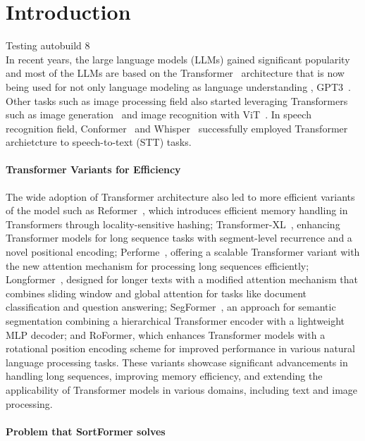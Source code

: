 \documentclass{article}
\begin{document}
\section{Introduction}
Testing autobuild 8 \\
In recent years, the large language models (LLMs) \cite{radford2019language, rao2022megatron} gained significant popularity and most of the LLMs are based on the Transformer~\cite{vaswani2017attention} architecture that is now being used for not only language modeling
as language understanding \cite{devlin2018bert, raffel2019learning}, GPT3~\cite{brown2020gpt3}. Other tasks such as image processing field also started leveraging Transformers such as image generation~\cite{parmar2018image} and image recognition with ViT~\cite{dosovitskiy2020image}. In speech recognition field, Conformer~\cite{gulati2020conformer} and Whisper~\cite{radford2023robust} successfully employed Transformer archietcture to speech-to-text (STT) tasks.

\paragraph{Transformer Variants for Efficiency}
The wide adoption of Transformer architecture also led to more efficient variants of the model such as Reformer~\cite{kitaev2019reformer}, which introduces efficient memory handling in Transformers through locality-sensitive hashing; Transformer-XL~\cite{dai2019transformer}, enhancing Transformer models for long sequence tasks with segment-level recurrence and a novel positional encoding; Performe~\cite{choromanski2020rethinking}, offering a scalable Transformer variant with the new attention mechanism for processing long sequences efficiently; Longformer~\cite{beltagy2020longformer}, designed for longer texts with a modified attention mechanism that combines sliding window and global attention for tasks like document classification and question answering; SegFormer~\cite{xie2021segformer}, an approach for semantic segmentation combining a hierarchical Transformer encoder with a lightweight MLP decoder; and RoFormer\cite{su2023roformer}, which enhances Transformer models with a rotational position encoding scheme for improved performance in various natural language processing tasks. These variants showcase significant advancements in handling long sequences, improving memory efficiency, and extending the applicability of Transformer models in various domains, including text and image processing.

\paragraph{Problem that SortFormer solves}
\end{document}
